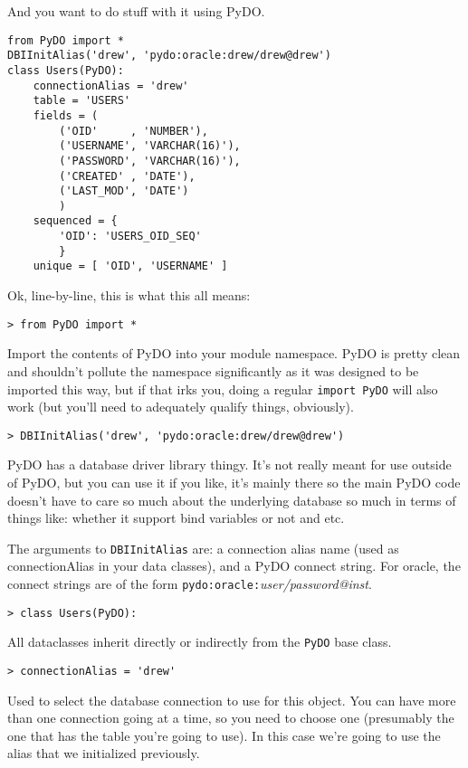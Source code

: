\documentclass[titlepage]{manual}
\begin{document}
And you want to do stuff with it using PyDO.

\begin{verbatim}
from PyDO import *
DBIInitAlias('drew', 'pydo:oracle:drew/drew@drew')
class Users(PyDO):
    connectionAlias = 'drew'
    table = 'USERS'
    fields = (
        ('OID'     , 'NUMBER'),
        ('USERNAME', 'VARCHAR(16)'),
        ('PASSWORD', 'VARCHAR(16)'),
        ('CREATED' , 'DATE'),
        ('LAST_MOD', 'DATE')
        )
    sequenced = {
        'OID': 'USERS_OID_SEQ'
        }
    unique = [ 'OID', 'USERNAME' ]
\end{verbatim}

Ok, line-by-line, this is what this all means:

\begin{verbatim}
> from PyDO import *
\end{verbatim}

Import the contents of PyDO into your module namespace.  PyDO is
pretty clean and shouldn't pollute the namespace significantly as it
was designed to be imported this way, but if that irks you, doing a
regular \texttt{import PyDO} will also work (but you'll need to
adequately qualify things, obviously).

\begin{verbatim}
> DBIInitAlias('drew', 'pydo:oracle:drew/drew@drew')
\end{verbatim}

PyDO has a database driver library thingy.  It's not really meant for use 
outside of PyDO, but you can use it if you like, it's mainly there so the main
PyDO code doesn't have to care so much about the underlying database so much
in terms of things like: whether it support bind variables or not and etc.

The arguments to \texttt{DBIInitAlias} are: a connection alias name
(used as connectionAlias in your data classes), and a PyDO connect
string.  For oracle, the connect strings are of the form
\texttt{pydo:oracle:}\emph{user/password@inst}.

\begin{verbatim}
> class Users(PyDO):
\end{verbatim}

All dataclasses inherit directly or indirectly from the \texttt{PyDO}
base class.

\begin{verbatim}
> connectionAlias = 'drew'
\end{verbatim}

Used to select the database connection to use for this object.  You
can have more than one connection going at a time, so you need to
choose one (presumably the one that has the table you're going to
use).  In this case we're going to use the alias that we initialized
previously. 
\end{document}

